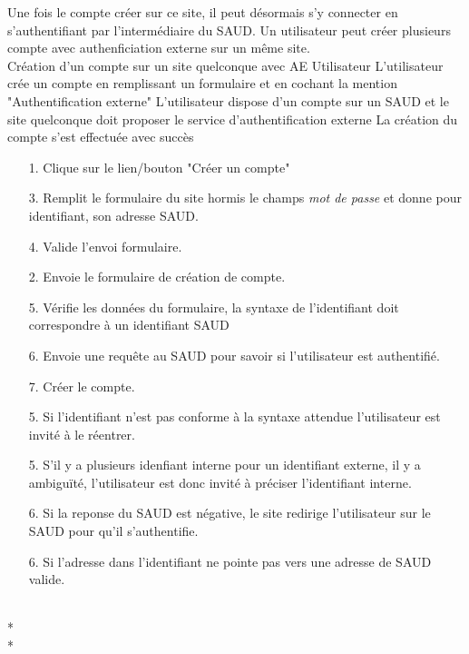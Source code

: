 \documentclass[a4paper,11pt,french]{article}
\begin{document}
Une fois le compte créer sur ce site, il peut désormais s'y connecter en s'authentifiant
par l'intermédiaire du SAUD. Un utilisateur peut créer plusieurs compte avec authenficiation
externe sur un même site.\\

\fiche
	{Création d'un compte sur un site quelconque avec AE}
	{Utilisateur}
	{L'utilisateur crée un compte en remplissant un formulaire et en cochant la mention
    "Authentification externe"}
	{L'utilisateur dispose d'un compte sur un SAUD et le site quelconque doit proposer le service d'authentification externe}
	{}
	{La création du compte s'est effectuée avec succès}
	{\begin{itemize}
        \item[]
		\item[1.] Clique sur le lien/bouton "Créer un compte"
        \item[3.] Remplit le formulaire du site hormis le champs \emph{mot de
passe} et donne pour identifiant, son adresse SAUD.
        \item[4.] Valide l'envoi formulaire.
	\end{itemize}
	}
	{\begin{itemize}
        \item[]
		\item[2.] Envoie le formulaire de création de compte.
		\item[5.] Vérifie les données du formulaire, la syntaxe de
l'identifiant doit correspondre à un identifiant SAUD
		\item[6.] Envoie une requête au SAUD pour savoir si l'utilisateur est authentifié.
        \item[7.] Créer le compte.
	\end{itemize}
	}
	{}
\flots
    {\begin{itemize}
    \item[]
    \item[5.] Si l'identifiant n'est pas conforme à la syntaxe attendue
    l'utilisateur est invité à le réentrer.
    \item[5.] S'il y a plusieurs idenfiant interne pour un identifiant externe, il y a ambiguïté,
    l'utilisateur est donc invité à préciser l'identifiant interne.
    \item[6.] Si la reponse du SAUD est négative, le site redirige l'utilisateur sur le SAUD pour 
    qu'il s'authentifie.
    \item[6.] Si l'adresse dans l'identifiant ne pointe pas vers une adresse
de SAUD valide.
    \end{itemize}
    }
    {}
\\*
\\*
\end{document}
